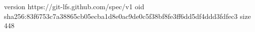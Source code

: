 version https://git-lfs.github.com/spec/v1
oid sha256:83f6753c7a38865cb05ecba1d8e0ac9de0c5f38bf8fe3ff6dd5df4ddd3fdfec3
size 448
